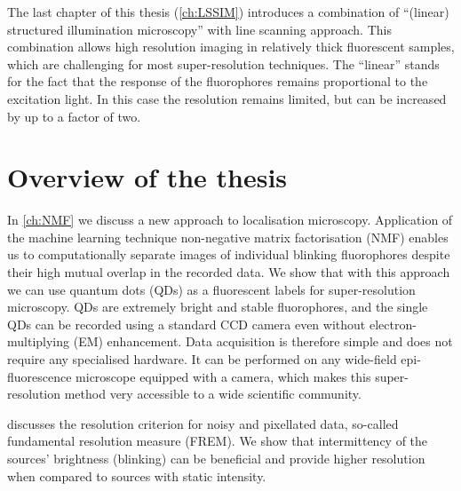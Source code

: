 The last chapter of this thesis (\autoref{ch:LSSIM}) introduces a combination of ``(linear) structured illumination microscopy'' with line scanning approach. This combination allows high resolution imaging in relatively thick fluorescent samples, which are challenging for most super-resolution techniques. The ``linear'' stands for the fact that the response of the fluorophores remains proportional to the excitation light. In this case the resolution remains limited, but can be increased by up to a factor of two.  



\clearpage
\section{Overview of the thesis}


In \autoref{ch:NMF} we discuss a new approach to localisation microscopy. Application of the machine learning technique non-negative matrix factorisation (NMF) enables us to computationally separate images of individual blinking fluorophores despite their high mutual overlap in the recorded data. We show that with this approach we can use quantum dots (QDs) as a fluorescent labels for super-resolution microscopy. QDs are extremely bright and stable fluorophores, and the single QDs can be recorded using a standard CCD camera even without electron-multiplying (EM) enhancement. Data acquisition is therefore simple and does not require any specialised hardware. It can be performed on any wide-field epi-fluorescence microscope equipped with a camera, which makes this super-resolution method very accessible to a wide scientific community. 

 discusses the resolution criterion for noisy and pixellated data, so-called fundamental resolution measure (FREM). We show that intermittency of the sources' brightness (blinking) can be beneficial and provide higher resolution when compared to sources with static intensity. 

